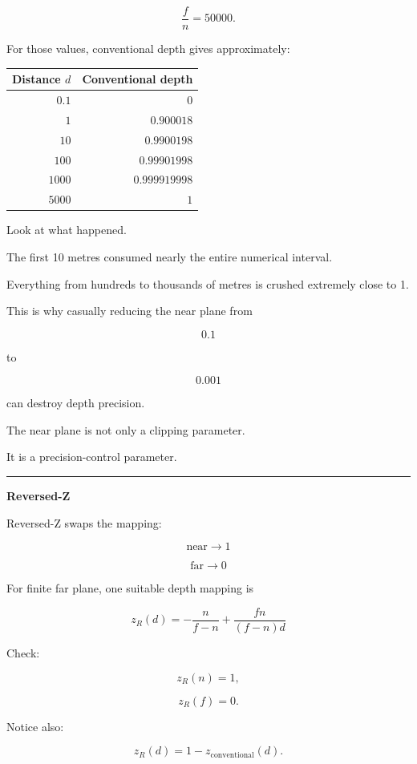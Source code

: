 \[
\frac fn=50000.
\]

For those values, conventional depth gives approximately:

{\def\LTcaptype{none} %
\begin{longtable}[]{@{}rr@{}}
\toprule\noalign{}
Distance \(d\) & Conventional depth \\
\midrule\noalign{}
\endhead
\bottomrule\noalign{}
\endlastfoot
\(0.1\) & \(0\) \\
\(1\) & \(0.900018\) \\
\(10\) & \(0.9900198\) \\
\(100\) & \(0.99901998\) \\
\(1000\) & \(0.999919998\) \\
\(5000\) & \(1\) \\
\end{longtable}
}

Look at what happened.

The first 10 metres consumed nearly the entire numerical interval.

Everything from hundreds to thousands of metres is crushed extremely close to 1.

This is why casually reducing the near plane from

\[
0.1
\]

to

\[
0.001
\]

can destroy depth precision.

The near plane is not only a clipping parameter.

It is a precision-control parameter.

\begin{center}\rule{0.5\linewidth}{0.5pt}\end{center}

\textbf{Reversed-Z}

Reversed-Z swaps the mapping:

\[
\boxed{
\text{near}\rightarrow1
}
\]

\[
\boxed{
\text{far}\rightarrow0
}
\]

For finite far plane, one suitable depth mapping is

\[
\boxed{
z_R(d)
=
-\frac{n}{f-n}
+
\frac{fn}{(f-n)d}
}
\]

Check:

\[
z_R(n)=1,
\]

\[
z_R(f)=0.
\]

Notice also:

\[
z_R(d)=1-z_{\text{conventional}}(d).
\]

